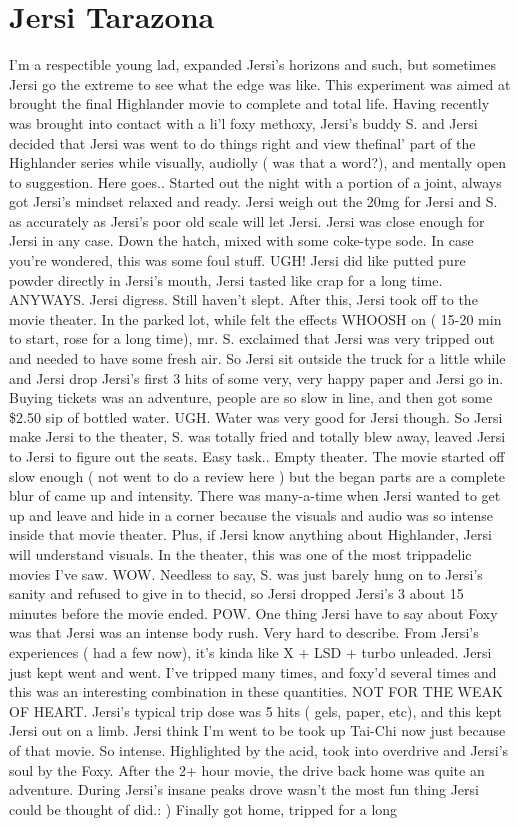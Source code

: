 \documentclass[12pt]{book}
\begin{document}
\chapter{Jersi Tarazona}

I'm a respectible young lad, expanded Jersi's horizons and such, but sometimes Jersi go the extreme to see what the edge was like. This experiment was aimed at brought the final Highlander movie to complete and total life. Having recently was brought into contact with a li'l foxy methoxy, Jersi's buddy S. and Jersi decided that Jersi was went to do things right and view thefinal' part of the Highlander series while visually, audiolly ( was that a word?), and mentally open to suggestion. Here goes.. Started out the night with a portion of a joint, always got Jersi's mindset relaxed and ready. Jersi weigh out the 20mg for Jersi and S. as accurately as Jersi's poor old scale will let Jersi. Jersi was close enough for Jersi in any case. Down the hatch, mixed with some coke-type sode. In case you're wondered, this was some foul stuff. UGH! Jersi did like putted pure powder directly in Jersi's mouth, Jersi tasted like crap for a long time. ANYWAYS. Jersi digress. Still haven't slept. After this, Jersi took off to the movie theater. In the parked lot, while felt the effects WHOOSH on ( 15-20 min to start, rose for a long time), mr. S. exclaimed that Jersi was very tripped out and needed to have some fresh air. So Jersi sit outside the truck for a little while and Jersi drop Jersi's first 3 hits of some very, very happy paper and Jersi go in. Buying tickets was an adventure, people are so slow in line, and then got some \$2.50 sip of bottled water. UGH. Water was very good for Jersi though. So Jersi make Jersi to the theater, S. was totally fried and totally blew away, leaved Jersi to Jersi to figure out the seats. Easy task.. Empty theater. The movie started off slow enough ( not went to do a review here ) but the began parts are a complete blur of came up and intensity. There was many-a-time when Jersi wanted to get up and leave and hide in a corner because the visuals and audio was so intense inside that movie theater. Plus, if Jersi know anything about Highlander, Jersi will understand visuals. In the theater, this was one of the most trippadelic movies I've saw. WOW. Needless to say, S. was just barely hung on to Jersi's sanity and refused to give in to thecid, so Jersi dropped Jersi's 3 about 15 minutes before the movie ended. POW. One thing Jersi have to say about Foxy was that Jersi was an intense body rush. Very hard to describe. From Jersi's experiences ( had a few now), it's kinda like X + LSD + turbo unleaded. Jersi just kept went and went. I've tripped many times, and foxy'd several times and this was an interesting combination in these quantities. NOT FOR THE WEAK OF HEART. Jersi's typical trip dose was 5 hits ( gels, paper, etc), and this kept Jersi out on a limb. Jersi think I'm went to be took up Tai-Chi now just because of that movie. So intense. Highlighted by the acid, took into overdrive and Jersi's soul by the Foxy. After the 2+ hour movie, the drive back home was quite an adventure. During Jersi's insane peaks drove wasn't the most fun thing Jersi could be thought of did.: ) Finally got home, tripped for a long 
\end{document}
